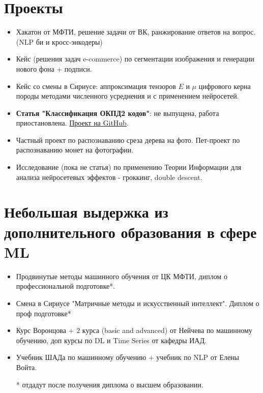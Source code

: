 \documentclass[a4paper,12pt]{article}
\begin{document}
\section*{Проекты}
\begin{itemize}
    \item Хакатон от МФТИ, решение задачи от ВК, ранжирование ответов на вопрос. (NLP би и кросс-энкодеры)
    \item Кейс (решения задач e-commerce) по сегментации изображения и генерации нового фона + подписи.
    \item Кейс со смены в Сириусе: аппроксимация тензоров \(E\) и \(\mu\) цифрового керна породы методами численного усреднения и с применением нейросетей.
    \item \textbf{Статья "Классификация ОКПД2 кодов"}: не выпущена, работа приостановлена. \href{https://github.com/intsystems/2024-Project-142}{Проект на GitHub}.
    \item Частный проект по распознаванию среза дерева на фото. Пет-проект по распознаванию монет на фотографии.
    \item Исследование (пока не статья) по применению Теории Информации для анализа нейросетевых эффектов - гроккинг, double descent.
\end{itemize}

\section*{Небольшая выдержка из дополнительного образования в сфере ML}
\begin{itemize}
    \item Продвинутые методы машинного обучения от ЦК МФТИ, диплом о профессиональной подготовке*. 
    \item Смена в Сириусе "Матричные методы и искусственный интеллект". Диплом о проф подготовке* 
    \item Курс Воронцова + 2 курса (basic and advanced) от Нейчева по машинному обучению, доп курсы по DL и Time Series от кафедры ИАД.
    \item Учебник ШАДа по машинному обучению + учебник по NLP от Елены Войта. 
    
* отдадут после получения диплома о высшем образовании.

\end{itemize}
\end{document}
